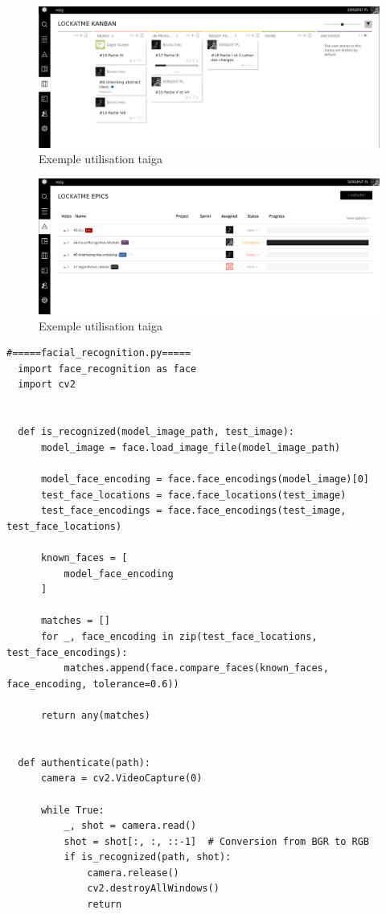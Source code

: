 \documentclass[french]{report}
\begin{document}
\begin{figure}[h]\label{fig:Taiga}
  \includegraphics[width=\linewidth]{taiga2}
  \caption{Exemple utilisation taiga}
  \label{fig:Taiga}
\end{figure}

\begin{figure}[h]\label{fig:Taiga}
  \includegraphics[width=\linewidth]{taiga}
  \caption{Exemple utilisation taiga}
  \label{fig:Taiga}
\end{figure}

\newpage

\begin{verbatim}
#=====facial_recognition.py=====
  import face_recognition as face
  import cv2


  def is_recognized(model_image_path, test_image):
      model_image = face.load_image_file(model_image_path)

      model_face_encoding = face.face_encodings(model_image)[0]
      test_face_locations = face.face_locations(test_image)
      test_face_encodings = face.face_encodings(test_image, test_face_locations)

      known_faces = [
          model_face_encoding
      ]

      matches = []
      for _, face_encoding in zip(test_face_locations, test_face_encodings):
          matches.append(face.compare_faces(known_faces, face_encoding, tolerance=0.6))

      return any(matches)


  def authenticate(path):
      camera = cv2.VideoCapture(0)

      while True:
          _, shot = camera.read()
          shot = shot[:, :, ::-1]  # Conversion from BGR to RGB
          if is_recognized(path, shot):
              camera.release()
              cv2.destroyAllWindows()
              return
\end{verbatim}
\end{document}
